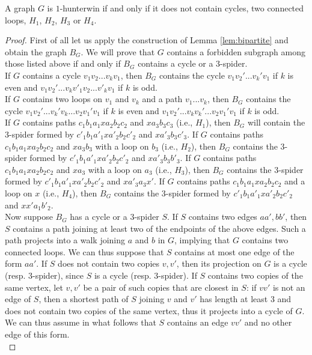\documentclass[runningheads]{llncs}
\begin{document}
\begin{theorem}
A graph $G$ is $1$-hunterwin if and only if it does not contain cycles,  two connected loops, 
{ $H_1$,  $H_2$,  $H_3$ or $H_4$.}
\end{theorem}
\begin{proof}
First of all let us apply the construction of Lemma \ref{lem:bipartite} and obtain the graph $B_G$. We will prove that $G$ contains a forbidden subgraph among those listed above if and only if $B_G$ contains a cycle or a $3$-spider.\\
If $G$ contains a cycle $v_1v_2...v_kv_1$, then $B_G$ contains the cycle $v_1v_2'...v_k'v_1$ if $k$ is even  %
{and $v_1 v_2'...v_k v'_1 v_2 ... v'_k v_1$ }
if $k$ is odd.\\
If $G$ contains two loops on $v_1$ and $v_k$ and a path $v_1...v_k$, then $B_G$ contains the cycle $v_1v_2'...v_k'v_k...v_2v_1'v_1$ if $k$ is even and $v_1v_2'...v_kv_k'...v_2v_1'v_1$ if $k$ is odd.\\
If $G$ contains paths $c_1b_1a_1xa_2b_2c_2$ and $xa_3b_3c_3$ {(i.e., $H_1$),} then $B_G$ will contain the $3$-spider formed by $c'_1b_1a'_1xa'_2b_2c'_2$ and $xa'_3b_3c'_3$. If $G$ contains paths $c_1b_1a_1xa_2b_2c_2$ and $xa_3b_3$ with a loop on $b_3$ {(i.e., $H_2$),} then $B_G$ contains the $3$-spider formed by $c'_1b_1a'_1xa'_2b_2c'_2$ and 
{$xa'_3b_3b'_3$}. If $G$ contains paths $c_1b_1a_1xa_2b_2c_2$ and $xa_3$ with a loop on $a_3$ {(i.e., $H_3$),} then $B_G$ contains the $3$-spider formed by $c'_1b_1a'_1xa'_2b_2c'_2$ and $xa'_3a_3x'$. If $G$ contains paths $c_1b_1a_1xa_2b_2c_2$ and a loop on $x$ {(i.e., $H_4$),} then $B_G$ contains the $3$-spider formed by $c'_1b_1a'_1xa'_2b_2c'_2$ and $xx'a_1b'_2$.\\
Now suppose $B_G$ has a cycle or a $3$-spider $S$. If $S$ contains two edges $aa',bb'$, then $S$ contains a path joining at least two of the endpoints of the above edges. Such a path projects into a walk joining $a$ and $b$ in $G$, implying that $G$ contains two connected loops. We can thus suppose that $S$ contains at most one edge of the form $aa'$. If $S$ does not contain two copies $v,v'$, then its projection on $G$ is a cycle (resp. $3$-spider), since $S$ is a cycle (resp. $3$-spider). If $S$ contains two copies of the same vertex, let $v,v'$ be a pair of such copies that are closest in $S$: if $vv'$ is not an edge of $S$, then a shortest path of $S$ joining $v$ and $v'$ has length at least 3 and does not contain two copies of the same vertex, thus it projects into a cycle of $G$. We can thus assume in what follows that $S$ contains an edge $vv'$ and no other edge of this form. \\

\end{proof}
\end{document}
